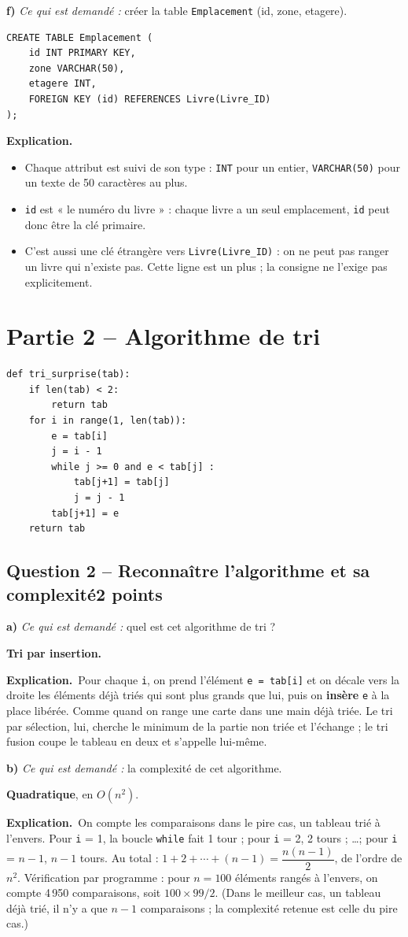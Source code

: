 \documentclass[11pt, a4paper]{exam}
\newcommand{\code}[1]{\texttt{#1}}
\newcommand{\Qt}[2]{\subsection*{#1\hfill{\normalfont\small #2}}}
\newcommand{\rappel}[1]{\noindent\textit{Ce qui est demandé :} #1\par\smallskip}
\newcommand{\explication}{\noindent\textbf{Explication.}\ }
\begin{document}
\textbf{f)} \rappel{créer la table \code{Emplacement} (id, zone, etagere).}
\begin{reponse}
\begin{lstlisting}[style=sqlc]
CREATE TABLE Emplacement (
    id INT PRIMARY KEY,
    zone VARCHAR(50),
    etagere INT,
    FOREIGN KEY (id) REFERENCES Livre(Livre_ID)
);
\end{lstlisting}
\end{reponse}
\explication
\begin{itemize}
\item Chaque attribut est suivi de son type : \code{INT} pour un entier, \code{VARCHAR(50)} pour un texte de 50 caractères au plus.
\item \code{id} est « le numéro du livre » : chaque livre a un seul emplacement, \code{id} peut donc être la clé primaire.
\item C'est aussi une clé étrangère vers \code{Livre(Livre\_ID)} : on ne peut pas ranger un livre qui n'existe pas. Cette ligne est un plus ; la consigne ne l'exige pas explicitement.
\end{itemize}

\section*{Partie 2 -- Algorithme de tri}

\begin{lstlisting}
def tri_surprise(tab):
    if len(tab) < 2:
        return tab
    for i in range(1, len(tab)):
        e = tab[i]
        j = i - 1
        while j >= 0 and e < tab[j] :
            tab[j+1] = tab[j]
            j = j - 1
        tab[j+1] = e
    return tab
\end{lstlisting}

\Qt{Question 2 -- Reconnaître l'algorithme et sa complexité}{2 points}

\textbf{a)} \rappel{quel est cet algorithme de tri ?}
\begin{reponse}
\textbf{Tri par insertion.}
\end{reponse}
\explication Pour chaque \code{i}, on prend l'élément \code{e = tab[i]} et on décale vers la droite les éléments déjà triés qui sont plus grands que lui, puis on \textbf{insère} \code{e} à la place libérée. Comme quand on range une carte dans une main déjà triée. Le tri par sélection, lui, cherche le minimum de la partie non triée et l'échange ; le tri fusion coupe le tableau en deux et s'appelle lui-même.

\textbf{b)} \rappel{la complexité de cet algorithme.}
\begin{reponse}
\textbf{Quadratique}, en $O(n^2)$.
\end{reponse}
\explication On compte les comparaisons dans le pire cas, un tableau trié à l'envers. Pour \code{i} = 1, la boucle \code{while} fait 1 tour ; pour \code{i} = 2, 2 tours ; \ldots ; pour \code{i} = $n-1$, $n-1$ tours. Au total : $1 + 2 + \cdots + (n-1) = \dfrac{n(n-1)}{2}$, de l'ordre de $n^2$. Vérification par programme : pour $n = 100$ éléments rangés à l'envers, on compte 4\,950 comparaisons, soit $100 \times 99 / 2$. (Dans le meilleur cas, un tableau déjà trié, il n'y a que $n - 1$ comparaisons ; la complexité retenue est celle du pire cas.)
\end{document}
